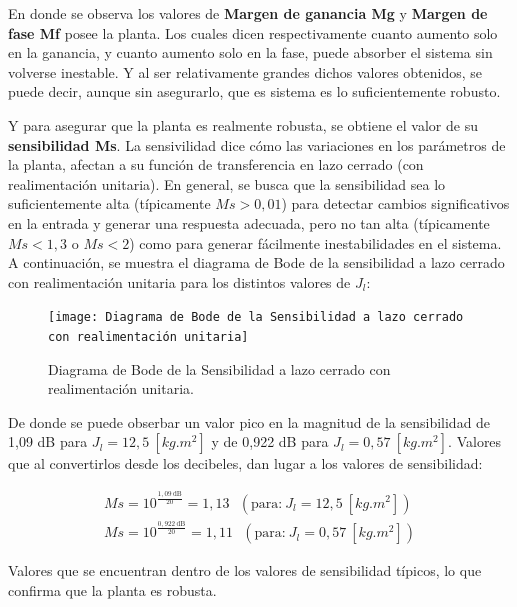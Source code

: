 \documentclass{article}
\begin{document}
\begin{sloppypar}
En donde se observa los valores de \textbf{Margen de ganancia Mg} y \textbf{Margen de fase Mf} posee la planta. Los cuales dicen respectivamente cuanto aumento solo en la ganancia, y cuanto aumento solo en la fase, puede absorber el sistema sin volverse inestable. Y al ser relativamente grandes dichos valores obtenidos, se puede decir, aunque sin asegurarlo, que es sistema es lo suficientemente robusto.

Y para asegurar que la planta es realmente robusta, se obtiene el valor de su \textbf{sensibilidad Ms}. La sensivilidad dice cómo las variaciones en los parámetros de la planta, afectan a su función de transferencia en lazo cerrado (con realimentación unitaria). En general, se busca que la sensibilidad sea lo suficientemente alta (típicamente $Ms>0,01$) para detectar cambios significativos en la entrada y generar una respuesta adecuada, pero no tan alta (típicamente $Ms<1,3$ o $Ms<2$) como para generar fácilmente inestabilidades en el sistema. A continuación, se muestra el diagrama de Bode de la sensibilidad a lazo cerrado con realimentación unitaria para los distintos valores de $J_l$:

\begin{figure}[H]
    \centering
    \texttt{[image: Diagrama de Bode de la Sensibilidad a lazo cerrado con realimentación unitaria]}
    \caption{Diagrama de Bode de la Sensibilidad a lazo cerrado con realimentación unitaria.}
    \label{fig:Diagrama de Bode de la Sensibilidad a lazo cerrado con realimentación unitaria}
\end{figure}

De donde se puede obserbar un valor pico en la magnitud de la sensibilidad de 1,09 dB para $J_l=12,5 ~[kg.m^2]$ y de 0,922 dB para $J_l=0,57 ~[kg.m^2]$. Valores que al convertirlos desde los decibeles, dan lugar a los valores de sensibilidad:

\begin{subequations} \label{eq:Valores de Sensibilidad}
	\begin{align}
        Ms=10^{\frac{1,09 ~\text{dB}}{20}}=1,13 ~~~(\text{para:}~ J_l=12,5 ~[kg.m^2])
        \\
        Ms=10^{\frac{0,922 ~\text{dB}}{20}}=1,11 ~~~(\text{para:}~ J_l=0,57 ~[kg.m^2])
	\end{align}
\end{subequations}

Valores que se encuentran dentro de los valores de sensibilidad típicos, lo que confirma que la planta es robusta.



\end{sloppypar}
\end{document}

